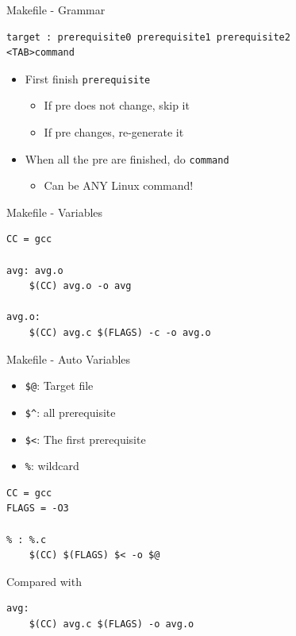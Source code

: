 \documentclass{../TexTemplate/myslide}
\begin{document}
\begin{frame}[fragile]{Makefile - Grammar}
\begin{verbatim}
target : prerequisite0 prerequisite1 prerequisite2
<TAB>command
\end{verbatim}
\begin{itemize}
	\item First finish \verb'prerequisite'
	\begin{itemize}
		\item If pre does not change, skip it
		\item If pre changes, re-generate it
	\end{itemize}
	\item When all the pre are finished, do \verb'command'
	\begin{itemize}
		\item Can be ANY Linux command!
	\end{itemize}
\end{itemize}
\end{frame}

\begin{frame}[fragile]{Makefile - Variables}
\begin{verbatim}
CC = gcc

avg: avg.o
	$(CC) avg.o -o avg

avg.o:
	$(CC) avg.c $(FLAGS) -c -o avg.o
\end{verbatim}
\end{frame}

\begin{frame}[fragile]{Makefile - Auto Variables}
\begin{itemize}
	\item \verb'$@': Target file
	\item \verb'$^': all prerequisite
	\item \verb'$<': The first prerequisite
	\item \verb'%': wildcard
\end{itemize}
\begin{verbatim}
CC = gcc
FLAGS = -O3

% : %.c
	$(CC) $(FLAGS) $< -o $@
\end{verbatim}
Compared with
\begin{verbatim}
avg:
	$(CC) avg.c $(FLAGS) -o avg.o
\end{verbatim}
\end{frame}
\end{document}
